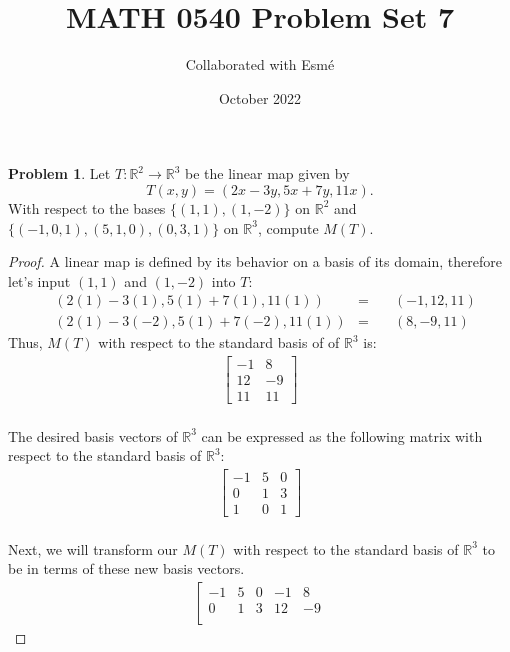 \documentclass[12pt,reqno]{article}
\title{MATH 0540 Problem Set 7}
\author{Collaborated with Esmé}
\date{October 2022}
\theoremstyle{definition}
\newtheorem{problem}{Problem}
\begin{document}
\maketitle


\begin{problem}
Let $T: \mathbb{R}^2 \rightarrow \mathbb{R}^3$ be the linear map given by
$$
T(x,y) = (2x-3y,5x+7y,11x).
$$
With respect to the bases $\{(1,1),(1,-2)\}$ on $\mathbb{R}^2$ and $\{(-1,0,1),(5,1,0),(0,3,1)\}$ on $\mathbb{R}^3$, compute $M(T)$.
\end{problem}

\begin{proof}
    A linear map is defined by its behavior on a basis of its domain, therefore let's input $(1, 1)$ and $(1, -2)$ into $T$:
    \begin{align*}
        &(2(1) - 3(1), 5(1) + 7(1), 11(1)) &= &\quad(-1, 12, 11)\\
        &(2(1) - 3(-2), 5(1) + 7(-2), 11(1)) &= &\quad(8, -9, 11)
    \end{align*}
    Thus, $M(T)$ with respect to the standard basis of of $\mathbb{R}^3$ is:
    \begin{align*}
        \begin{bmatrix}
            -1 & 8 \\
            12 & -9 \\
            11 & 11
        \end{bmatrix}
    \end{align*}
    \\ The desired basis vectors of $\mathbb{R}^3$ can be expressed as the following matrix with respect to the standard basis of $\mathbb{R}^3$:
    \begin{align*}
        \begin{bmatrix}
            -1 & 5 & 0 \\
            0 & 1 & 3 \\
            1 & 0 & 1
        \end{bmatrix}
    \end{align*}
    \\ Next, we will transform our $M(T)$ with respect to the standard basis of $\mathbb{R}^3$ to be in terms of these new basis vectors.
    \begin{align*}
        \left[\begin{array}{ccc|cc}
             -1 & 5 & 0 & -1 & 8\\
            0 & 1 & 3 & 12 & -9\\

\end{array}
\end{align*}
\end{proof}
\end{document}
